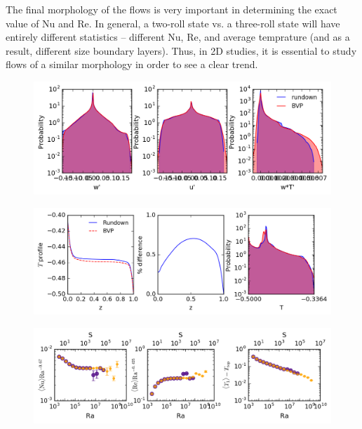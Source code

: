 \documentclass[aps, pre, onecolumn, nofootinbib, notitlepage, groupedaddress, amsfonts, amssymb, amsmath, longbibliography]{revtex4-1}
\begin{document}
The final morphology of the flows is very important in determining the exact value of Nu and Re.  In general,
a two-roll state vs. a three-roll state will have entirely different statistics -- different Nu, Re, and average
temprature (and as a result, different size boundary layers).  Thus, in 2D studies, it is essential to study flows
of a similar morphology in order to see a clear trend. 

\begin{figure}[t]
\includegraphics[width=\textwidth]{./figs/pdf_comparison.png}
\caption{\label{fig:pdf_comparison} }
\end{figure}

\begin{figure}[t]
\includegraphics[width=\textwidth]{./figs/temp_comparison.png}
\caption{\label{fig:temp_comparison} }
\end{figure}

\begin{figure}[t]
\includegraphics[width=\textwidth]{./figs/parameter_space_comparison.png}
\caption{\label{fig:parameter_space_comparison} }
\end{figure}
\end{document}
